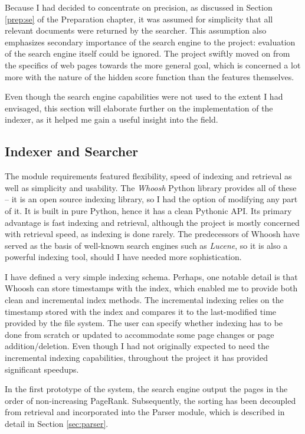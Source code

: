 \documentclass[12pt,a4paper,notitlepage,twoside]{scrbook}
\begin{document}
Because I had decided to concentrate on precision, as discussed in Section \ref{prep:se}
of the Preparation chapter, it was assumed for simplicity that all relevant documents were
returned by the searcher. This assumption also emphasizes secondary importance of the
search engine to the project: evaluation of the search engine itself could be ignored. The
project swiftly moved on from the specifics of web pages towards the more general goal,
which is concerned a lot more with the nature of the hidden score function than the
features themselves.

Even though the search engine capabilities were not used to the extent I had envisaged,
this section will elaborate further on the implementation of the indexer, as it helped me
gain a useful insight into the field.

\subsection{Indexer and Searcher}

The module requirements featured flexibility, speed of indexing and retrieval as well as
simplicity and usability.  The \textit{Whoosh} Python library provides all of these -- it
is  an open source indexing library, so I had the option of modifying any part of it.  It
is  built in pure Python, hence it has a clean Pythonic API. Its primary advantage is fast
indexing and retrieval, although the project is mostly concerned with retrieval speed, as
indexing is done rarely. The predecessors of Whoosh have served as the basis of well-known
search engines such as \textit{Lucene}, so it is also a powerful indexing tool, should I
have needed more sophistication.

I have defined a very simple indexing schema. Perhaps, one notable detail is that Whoosh
can store timestamps with the index, which enabled me to provide both clean and
incremental index methods. The incremental indexing relies on the timestamp stored with
the index and compares it to the last-modified time provided by the file system. The user
can specify whether indexing has to be done from scratch or updated to accommodate some
page changes or page addition/deletion. Even though I had not originally expected
to need the incremental indexing capabilities, throughout the project it has provided
significant speedups.

In the first prototype of the system, the search engine output the pages in the order of
non-increasing PageRank. Subsequently, the sorting has been decoupled from retrieval and
incorporated into the Parser module, which is described in detail in Section
\ref{sec:parser}.
\end{document}
